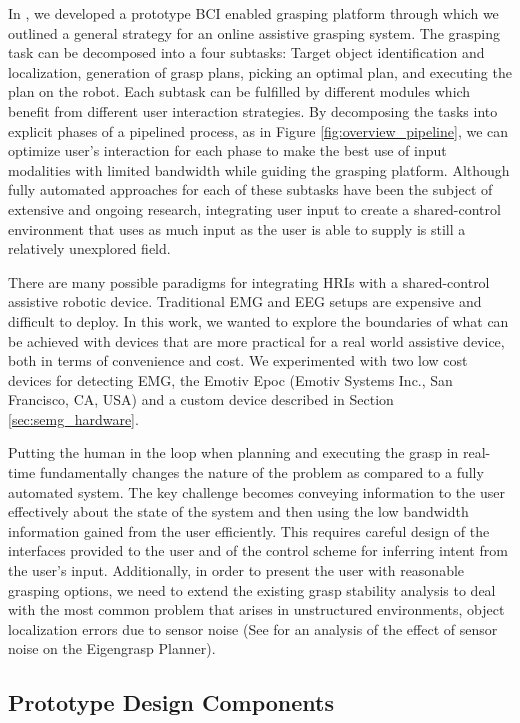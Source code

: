 \renewcommand*{\theHsection}{chX.\the\value{section}}
In \cite{Weisz2012c}, we developed a prototype BCI enabled grasping platform through which we outlined a general strategy for an online assistive grasping system. 
The grasping task can be decomposed into a four subtasks: Target object identification and localization, generation of grasp plans, picking an optimal plan, and executing the plan on the robot. Each subtask can be fulfilled by different modules which benefit from different user interaction strategies. By decomposing the tasks into explicit phases of a pipelined process, as in Figure \ref{fig:overview_pipeline}, we can optimize user's interaction for each phase to make the best use of input modalities with limited bandwidth while guiding the grasping platform. 
Although fully automated approaches for each of these subtasks have been the subject of extensive and ongoing research, integrating user input to create a shared-control environment that uses as much input as the user is able to supply is still a relatively unexplored field.

 There are many possible paradigms for integrating HRIs with a shared-control assistive robotic device. Traditional EMG and EEG setups are expensive and difficult to deploy. In this work, we wanted to explore the boundaries of what can be achieved with devices that are more practical for a real world assistive device, both in terms of convenience and cost. We experimented with two low cost devices for detecting EMG, the Emotiv Epoc (Emotiv Systems Inc., San Francisco, CA, USA) and a custom device described in Section \ref{sec:semg_hardware}. 

Putting the human in the loop when planning and executing the grasp in real-time fundamentally changes the nature of the problem as compared to a fully automated system. The key challenge becomes conveying information to the user effectively about the state of the system and then using the low bandwidth information gained from the user efficiently. This requires careful design of the interfaces provided to the user and of the control scheme for inferring intent from the user's input. Additionally, in order to present the user with reasonable grasping options, we need to extend the existing grasp stability analysis to deal with the most common problem that arises in unstructured environments, object localization errors due to sensor noise (See \cite{Weisz2012} for an analysis of the effect of sensor noise on the Eigengrasp Planner). 

\subsection{Prototype Design Components}
